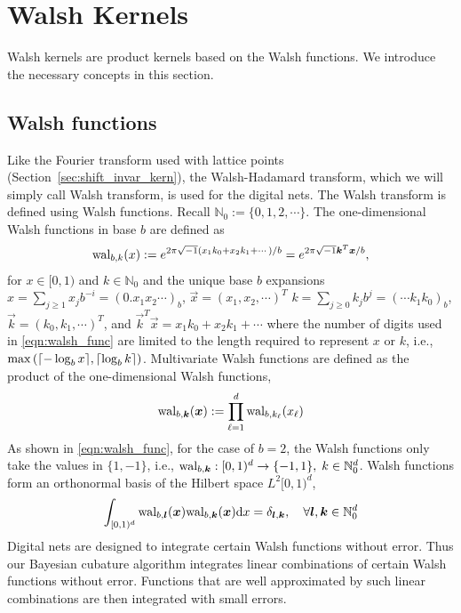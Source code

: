 \documentclass{svjour3}                     %
\newcommand{\bm}[1]{\boldsymbol{#1}}
\newcommand{\dif}[1]{\text{d}{#1}}
\newcommand{\naturals}{\mathbb{N}}
\newcommand{\vk}{\bm{k}}
\newcommand{\vl}{\bm{l}}
\newcommand{\vx}{\bm{x}}
\newcommand{\dx}{\dif{{x}}}
\DeclarePairedDelimiter{\ceil}{\lceil}{\rceil}
\begin{document}
\section{Walsh Kernels}

Walsh kernels are product kernels based on the Walsh functions. We introduce the necessary concepts in this section.

\subsection{Walsh functions}
Like the Fourier transform used with lattice points (Section~\ref{sec:shift_invar_kern}), the Walsh-Hadamard transform, which we will simply call Walsh transform, is used for the digital nets. The Walsh transform is defined using Walsh functions. Recall $\naturals_0 := \lbrace 0,1,2,\cdots \rbrace$.
The one-dimensional Walsh functions in base $b$ are defined as
\begin{align}
\label{eqn:walsh_func}
\textup{wal}_{b,k}(x) := e^{2\pi \sqrt{-1} (x_1 k_0 + x_2 k_1 + \cdots)/b} 
=
e^{2\pi \sqrt{-1} {\vec{k}}^T{\vec{x}}/b},
\end{align}
for $x \in [0,1)$ and $k \in \naturals_0$ and the unique base $b$ expansions 
$x = \sum_{j \ge 1} x_j b^{-i} = (0.x_1 x_2 \cdots)_b$, $\vec{x} =  (x_1,x_2,\cdots )^T$
$k = \sum_{j \ge 0} k_j b^{j} = ( \cdots k_1 k_0)_b$, $\vec{k} =  (k_0,k_1,\cdots )^T$, and ${\vec{k}}^T{\vec{x}} = x_1 k_0 + x_2 k_1 + \cdots$
where the number of digits used in \eqref{eqn:walsh_func} are limited to the length required to represent $x$ or $k$, i.e., $\max \left( {\ceil{ -\log_b{x}}, \ceil{\log_b{k}}  } \right)$.
Multivariate Walsh functions are defined as the product of the one-dimensional Walsh functions,
\begin{align*}
\textup{wal}_{b,\vk} (\vx) := \prod_{\ell=1}^d \textup{wal}_{b,k_\ell} (x_\ell
)
\end{align*}
As shown in \eqref{eqn:walsh_func}, for the case of $b=2$, the Walsh functions only take the values in $\{1, -1\}$, i.e., $\textup{wal}_{b,\vk} : [0,1)^d \to {\{-1, 1\}} , \; k \in \naturals_0^d$. Walsh functions form an orthonormal basis of the Hilbert space $L^2[0,1)^d$,
\begin{align*}
\int_{[0,1)^d}
\textup{wal}_{b,\vl} (\vx) \textup{wal}_{b,\vk}(\vx) \dx = \delta_{\vl, \vk}, \quad \forall \vl, \vk \in \naturals_0^d
\end{align*}
Digital nets are designed to integrate certain Walsh functions without error.
Thus our Bayesian cubature algorithm integrates linear combinations of %
certain Walsh functions without error. Functions that are well approximated by such linear combinations are then integrated with small errors.
\end{document}
